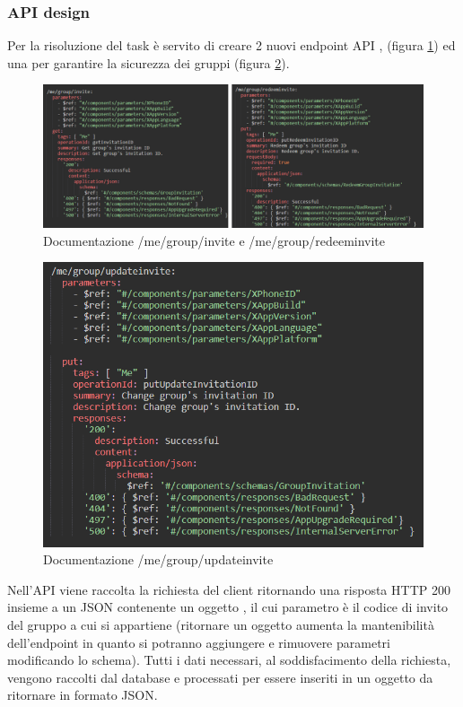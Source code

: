 \documentclass[main.tex]{subfiles}
\begin{document}
\subsubsection{API design}
Per la risoluzione del task è servito di creare 2 nuovi endpoint API ,  (figura \ref{fig:invite-redeem-group}) ed una per garantire la sicurezza dei gruppi  (figura \ref{fig:update-invitation-id}).
\begin{figure}[H]
    \centering
    \includegraphics[width=1\linewidth]{img/add-link-task/invite-redeem-group-separated.png}
    \caption{Documentazione /me/group/invite e /me/group/redeeminvite}
    \label{fig:invite-redeem-group}
\end{figure}
\begin{figure}[H]
    \centering
    \includegraphics[width=1\linewidth]{img/add-link-task/update-invitation-id.png}
    \caption{Documentazione /me/group/updateinvite}
    \label{fig:update-invitation-id}
\end{figure}
Nell'API  viene raccolta la richiesta del client ritornando una risposta HTTP 200 insieme a un JSON contenente un oggetto , il cui parametro è il codice di invito del gruppo a cui si appartiene (ritornare un oggetto aumenta la mantenibilità dell'endpoint in quanto si potranno aggiungere e rimuovere parametri modificando lo schema). Tutti i dati necessari, al soddisfacimento della richiesta, vengono raccolti dal database e processati per essere inseriti in un oggetto da ritornare in formato JSON.
\end{document}
